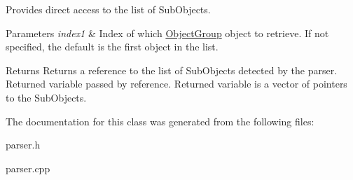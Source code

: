 Provides direct access to the list of Sub\-Objects. 


\begin{DoxyParams}{Parameters}
{\em index1} & Index of which \hyperlink{class_object_group}{Object\-Group} object to retrieve. If not specified, the default is the first object in the list. \\
\hline
\end{DoxyParams}
\begin{DoxyReturn}{Returns}
Returns a reference to the list of Sub\-Objects detected by the parser. Returned variable passed by reference. Returned variable is a vector of pointers to the Sub\-Objects. 
\end{DoxyReturn}


The documentation for this class was generated from the following files\-:\begin{DoxyCompactItemize}
\item 
parser.\-h\item 
parser.\-cpp\end{DoxyCompactItemize}

